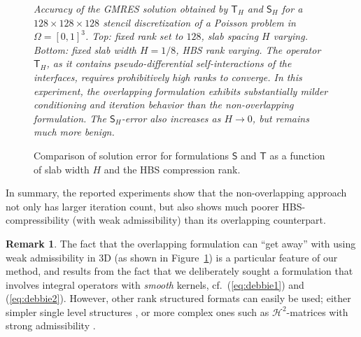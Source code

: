 \documentclass[final,onefignum,onetabnum]{siamart250211}
\newcommand{\vct}[1]{\bm{\mathsf{#1}}}
\newcommand{\mtx}[1]{\bm{\mathsf{#1}}}
\theoremstyle{definition}
\newtheorem{remark}{Remark}
\begin{document}
\begin{figure}
\begin{minipage}[t]{0.5\textwidth}
\datatableSrk
{}\datatableTrk
{}
\end{minipage}
\hfill
\begin{minipage}[t]{0.45\textwidth}
\small
\vspace{0pt}
\textit{Accuracy of the GMRES solution obtained by $\mtx{T}_{H}$ and $\mtx{S}_H$ for a $128\times128\times128$ stencil discretization of a Poisson problem in $\Omega = [0,1]^3$. Top: fixed rank set to $128$, slab spacing $H$ varying. Bottom: fixed slab width $H=1/8$, HBS rank varying. The operator $\mtx{T}_H$, as it contains pseudo-differential self-interactions of the interfaces, requires prohibitively high ranks to converge. In this experiment, the overlapping formulation exhibits substantially milder conditioning and iteration behavior than the non-overlapping formulation. The $\mtx{S}_{H}$-error also increases as $H\rightarrow 0$, but remains much more benign.}
\end{minipage}
\caption{Comparison of solution error for formulations $\mtx{S}$ and $\mtx{T}$
as a function of slab width $H$ and the HBS compression rank.}
\label{fig:gmres_comparison}
\end{figure}
In summary, the reported experiments show that the non-overlapping approach not only has larger iteration count, but also shows much poorer HBS-compressibility (with weak admissibility) than its overlapping counterpart.
\begin{remark}
The fact that the overlapping formulation can ``get away'' with using weak admissibility in 3D (as shown in Figure~\ref{fig:gmres_comparison}) is a particular feature of our method, and results from the fact that we deliberately sought a formulation that involves integral operators with \textit{smooth} kernels, cf.~(\ref{eq:debbie1}) and (\ref{eq:debbie2}). However, other rank structured formats can easily be used; either simpler single level structures \cite{2019_amestoy_BLR_multifrontal}, or more complex ones such as $\mathcal{H}^2$-matrices with strong admissibility \cite{2002_hackbusch_H2,2010_borm_book}.
\end{remark}
\end{document}
